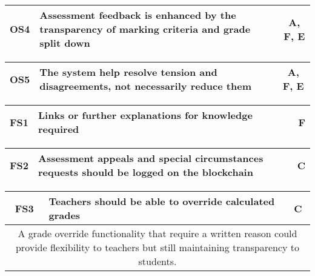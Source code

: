 \begin{table}[!ht]
	\begin{tabularx}{\textwidth}{|c|X|c|}
		\hline
		OS4 & \textbf{Assessment feedback is enhanced by the transparency of marking criteria and grade split down} & A, F, E                 \\
		\hline
	\end{tabularx}
\end{table}

\begin{table}[!ht]
	\begin{tabularx}{\textwidth}{|c|X|c|}
		\hline
		OS5 & \textbf{The system help resolve tension and disagreements, not necessarily reduce them} & A, F, E                 \\
		\hline
	\end{tabularx}
\end{table}

\begin{table}[!ht]
	\begin{tabularx}{\textwidth}{|c|X|c|}
		\hline
		FS1 & \textbf{Links or further explanations for knowledge required} & F                 \\
		\hline
	\end{tabularx}
\end{table}

\begin{table}[!ht]
	\begin{tabularx}{\textwidth}{|c|X|c|}
		\hline
		FS2 & \textbf{Assessment appeals and special circumstances requests should be logged on the blockchain} & C                 \\
		\hline
	\end{tabularx}
\end{table}

\begin{table}[!ht]
	\begin{tabularx}{\textwidth}{|c|X|c|}
		\hline
		FS3 & \textbf{Teachers should be able to override calculated grades} & C                 \\
		\hline
		\multicolumn{3}{|X|}{
			A grade override functionality that require a written reason could provide 
			flexibility to teachers but still maintaining transparency to students.
		} \\
		\hline
	\end{tabularx}
\end{table}


